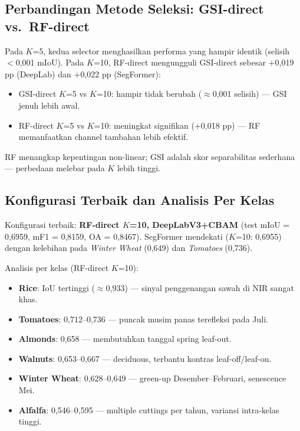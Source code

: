 \subsection{Perbandingan Metode Seleksi: GSI-direct vs.\ RF-direct}

Pada $K$=5, kedua selector menghasilkan performa yang hampir identik (selisih $<$0,001 mIoU).
Pada $K$=10, RF-direct mengungguli GSI-direct sebesar $+$0,019 pp (DeepLab) dan $+$0,022 pp (SegFormer):
\begin{itemize}
    \item GSI-direct $K$=5 vs $K$=10: hampir tidak berubah ($\approx$0,001 selisih) --- GSI jenuh lebih awal.
    \item RF-direct $K$=5 vs $K$=10: meningkat signifikan ($+$0,018 pp) --- RF memanfaatkan channel tambahan lebih efektif.
\end{itemize}

RF menangkap kepentingan non-linear; GSI adalah skor separabilitas sederhana --- perbedaan melebar pada $K$ lebih tinggi.

\subsection{Konfigurasi Terbaik dan Analisis Per Kelas}

Konfigurasi terbaik: \textbf{RF-direct $K$=10, DeepLabV3+CBAM} (test mIoU = 0,6959, mF1 = 0,8159, OA = 0,8467).
SegFormer mendekati ($K$=10: 0,6955) dengan kelebihan pada \textit{Winter Wheat} (0,649) dan \textit{Tomatoes} (0,736).

Analisis per kelas (RF-direct $K$=10):
\begin{itemize}
    \item \textbf{Rice}: IoU tertinggi ($\approx$0,933) --- sinyal penggenangan sawah di NIR sangat khas.
    \item \textbf{Tomatoes}: 0,712--0,736 --- puncak musim panas terefleksi pada Juli.
    \item \textbf{Almonds}: 0,658 --- membutuhkan tanggal spring leaf-out.
    \item \textbf{Walnuts}: 0,653--0,667 --- deciduous, terbantu kontras leaf-off/leaf-on.
    \item \textbf{Winter Wheat}: 0,628--0,649 --- green-up Desember--Februari, senescence Mei.
    \item \textbf{Alfalfa}: 0,546--0,595 --- multiple cuttings per tahun, variansi intra-kelas tinggi.
\end{itemize}

